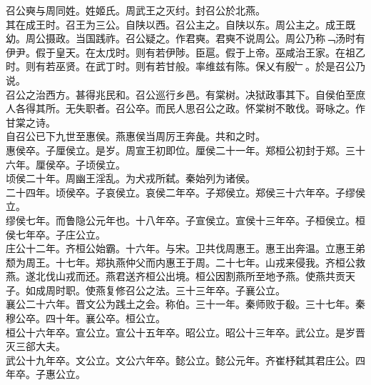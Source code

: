 \documentclass{zhvt-classic}
\begin{document}

\hspace*{2em}召公奭与周同姓。姓姬氏。周武王之灭纣。封召公於北燕。\\
\hspace*{2em}其在成王时。召王为三公。自陕以西。召公主之。自陕以东。周公主之。成王既幼。周公摄政。当国践祚。召公疑之。作君奭。君奭不说周公。周公乃称﹁汤时有伊尹。假于皇天。在太戊时。则有若伊陟。臣扈。假于上帝。巫咸治王家。在祖乙时。则有若巫贤。在武丁时。则有若甘般。率维兹有陈。保乂有殷﹂。於是召公乃说。\\
\hspace*{2em}召公之治西方。甚得兆民和。召公巡行乡邑。有棠树。决狱政事其下。自侯伯至庶人各得其所。无失职者。召公卒。而民人思召公之政。怀棠树不敢伐。哥咏之。作甘棠之诗。\\
\hspace*{2em}自召公已下九世至惠侯。燕惠侯当周厉王奔彘。共和之时。\\
\hspace*{2em}惠侯卒。子厘侯立。是岁。周宣王初即位。厘侯二十一年。郑桓公初封于郑。三十六年。厘侯卒。子顷侯立。\\
\hspace*{2em}顷侯二十年。周幽王淫乱。为犬戎所弑。秦始列为诸侯。\\
\hspace*{2em}二十四年。顷侯卒。子哀侯立。哀侯二年卒。子郑侯立。郑侯三十六年卒。子缪侯立。\\
\hspace*{2em}缪侯七年。而鲁隐公元年也。十八年卒。子宣侯立。宣侯十三年卒。子桓侯立。桓侯七年卒。子庄公立。\\
\hspace*{2em}庄公十二年。齐桓公始霸。十六年。与宋。卫共伐周惠王。惠王出奔温。立惠王弟颓为周王。十七年。郑执燕仲父而内惠王于周。二十七年。山戎来侵我。齐桓公救燕。遂北伐山戎而还。燕君送齐桓公出境。桓公因割燕所至地予燕。使燕共贡天子。如成周时职。使燕复修召公之法。三十三年卒。子襄公立。\\
\hspace*{2em}襄公二十六年。晋文公为践土之会。称伯。三十一年。秦师败于殽。三十七年。秦穆公卒。四十年。襄公卒。桓公立。\\
\hspace*{2em}桓公十六年卒。宣公立。宣公十五年卒。昭公立。昭公十三年卒。武公立。是岁晋灭三郤大夫。\\
\hspace*{2em}武公十九年卒。文公立。文公六年卒。懿公立。懿公元年。齐崔杼弑其君庄公。四年卒。子惠公立。\\
\end{document}
